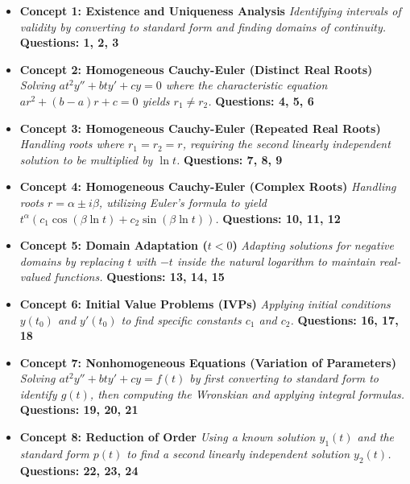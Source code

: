 \documentclass[11pt]{article}
\begin{document}
\begin{itemize}
    \item \textbf{Concept 1: Existence and Uniqueness Analysis} 
    \textit{Identifying intervals of validity by converting to standard form and finding domains of continuity.}
    \textbf{Questions: 1, 2, 3}
    
    \item \textbf{Concept 2: Homogeneous Cauchy-Euler (Distinct Real Roots)} 
    \textit{Solving $at^2y'' + bty' + cy = 0$ where the characteristic equation $ar^2 + (b-a)r + c = 0$ yields $r_1 \neq r_2$.}
    \textbf{Questions: 4, 5, 6}
    
    \item \textbf{Concept 3: Homogeneous Cauchy-Euler (Repeated Real Roots)} 
    \textit{Handling roots where $r_1 = r_2 = r$, requiring the second linearly independent solution to be multiplied by $\ln t$.}
    \textbf{Questions: 7, 8, 9}
    
    \item \textbf{Concept 4: Homogeneous Cauchy-Euler (Complex Roots)} 
    \textit{Handling roots $r = \alpha \pm i\beta$, utilizing Euler's formula to yield $t^\alpha(c_1 \cos(\beta \ln t) + c_2 \sin(\beta \ln t))$.}
    \textbf{Questions: 10, 11, 12}
    
    \item \textbf{Concept 5: Domain Adaptation ($t < 0$)} 
    \textit{Adapting solutions for negative domains by replacing $t$ with $-t$ inside the natural logarithm to maintain real-valued functions.}
    \textbf{Questions: 13, 14, 15}
    
    \item \textbf{Concept 6: Initial Value Problems (IVPs)} 
    \textit{Applying initial conditions $y(t_0)$ and $y'(t_0)$ to find specific constants $c_1$ and $c_2$.}
    \textbf{Questions: 16, 17, 18}
    
    \item \textbf{Concept 7: Nonhomogeneous Equations (Variation of Parameters)} 
    \textit{Solving $at^2y'' + bty' + cy = f(t)$ by first converting to standard form to identify $g(t)$, then computing the Wronskian and applying integral formulas.}
    \textbf{Questions: 19, 20, 21}
    
    \item \textbf{Concept 8: Reduction of Order} 
    \textit{Using a known solution $y_1(t)$ and the standard form $p(t)$ to find a second linearly independent solution $y_2(t)$.}
    \textbf{Questions: 22, 23, 24}
    

\end{itemize}
\end{document}
